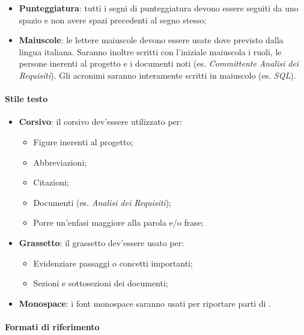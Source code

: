 \documentclass{scalatekids-article}
\begin{document}
\begin{itemize}
    \item \textbf{Punteggiatura}: tutti i segni di punteggiatura devono essere seguiti da uno spazio e non avere spazi precedenti al segno stesso;
    \item \textbf{Maiuscole}: le lettere maiuscole devono essere usate dove previsto dalla lingua italiana.
        Saranno inoltre scritti con l'iniziale maiuscola i ruoli, le persone inerenti al progetto e i documenti noti (es. \textit{Committente} \textit{Analisi dei Requisiti}). Gli acronimi saranno interamente scritti in maiuscolo (es. \textit{SQL}).
\end{itemize}

\paragraph{Stile testo}

\begin{itemize}
    \item \textbf{Corsivo}: il corsivo dev'essere utilizzato per:
        \begin{itemize}
            \item Figure inerenti al progetto;
            \item Abbreviazioni;
            \item Citazioni;
            \item Documenti (es. \textit{Analisi dei Requisiti});
            \item Porre un'enfasi maggiore alla parola e/o frase;
        \end{itemize}
    \item \textbf{Grassetto}: il grassetto dev'essere usato per:
        \begin{itemize}
            \item Evidenziare passaggi o concetti importanti;
            \item Sezioni e sottosezioni dei documenti;
        \end{itemize}
    \item \textbf{Monospace}: i font monospace saranno usati per riportare parti di .
\end{itemize}

\paragraph{Formati di riferimento}
\end{document}
